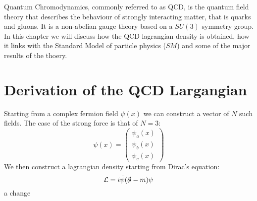 Quantum Chromodynamics, commonly referred to as QCD, is the quantum field theory that describes the behaviour of strongly interacting matter, that is quarks and gluons. It is a non-abelian gauge theory based on a $SU(3)$ symmetry group. In this chapter we will discuss how the QCD lagrangian density is obtained, how it links with the Standard Model of particle physics ($SM$) and some of the major results of the thoery. \cite{peskin}

\section{Derivation of the QCD Largangian}
Starting from a complex fermion field $\psi(x)$ we can construct a vector of $N$ such fields. The case of the strong force is that of $N=3$:
\begin{equation}
  \psi(x) = \begin{pmatrix}
      \psi_a(x)\\
      \psi_b(x)\\
      \psi_c(x)
  \end{pmatrix}
\end{equation}
We then construct a lagrangian density starting from Dirac's equation:
\begin{equation}
  \mathcal{L} = i\bar{\psi}(\slashed{\partial} - m )\psi
\end{equation}
a change

